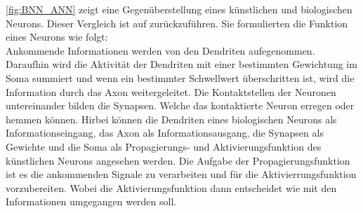 \addtocounter{footnote}{-1}     %
\addtocounter{Hfootnote}{-1}    %
\wrapfigfoot{}

\autoref{fig:BNN_ANN} zeigt eine Gegenüberstellung eines künstlichen und biologischen Neurons. Dieser Vergleich ist auf \citet{kneuron} zurückzuführen. Sie formulierten die Funktion eines Neurons wie folgt:\\ Ankommende Informationen werden von den Dendriten aufegenommen. Daraufhin wird die Aktivität der Dendriten  mit einer bestimmten Gewichtung im Soma summiert und wenn ein bestimmter Schwellwert überschritten ist, wird die Information durch das Axon weitergeleitet. Die Kontaktstellen der Neuronen untereinander bilden die Synapsen. Welche das kontaktierte Neuron erregen oder hemmen können. Hirbei können die Dendriten eines biologischen Neurons als Informationseingang, das Axon als Informationsausgang, die Synapsen als Gewichte und die Soma als Propagierungs- und Aktivierungsfunktion des künstlichen Neurons angesehen werden. Die Aufgabe der Propagierungsfunktion ist es die ankommenden Signale zu verarbeiten und für die Aktivierrungsfunktion vorzubereiten. Wobei die Aktivierungsfunktion dann entscheidet wie mit den Informationen umgegangen werden soll.


